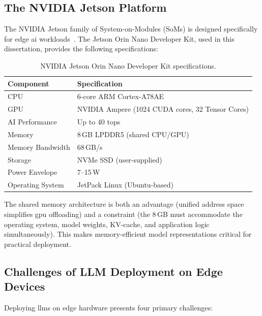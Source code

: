\documentclass[12pt,a4paper,oneside]{report}
\begin{document}
\subsection{The NVIDIA Jetson Platform}

The NVIDIA Jetson family of System-on-Modules (SoMs) is designed specifically for edge \gls{ai} workloads~\cite{nvidia2024jetson}. The Jetson Orin Nano Developer Kit, used in this dissertation, provides the following specifications:

\begin{table}[htbp]
\caption{NVIDIA Jetson Orin Nano Developer Kit specifications.}
\label{tab:jetson-specs}
\centering
\begin{tabular}{ll}
\toprule
\textbf{Component} & \textbf{Specification} \\
\midrule
CPU              & 6-core ARM Cortex-A78AE \\
GPU              & NVIDIA Ampere (1024 CUDA cores, 32 Tensor Cores) \\
AI Performance   & Up to 40 \gls{tops} \\
Memory           & 8\,GB LPDDR5 (shared CPU/GPU) \\
Memory Bandwidth & 68\,GB/s \\
Storage          & NVMe SSD (user-supplied) \\
Power Envelope   & 7--15\,W \\
Operating System & JetPack Linux (Ubuntu-based) \\
\bottomrule
\end{tabular}
\end{table}

The shared memory architecture is both an advantage (unified address space simplifies \gls{gpu} offloading) and a constraint (the 8\,GB must accommodate the operating system, model weights, KV-cache, and application logic simultaneously). This makes memory-efficient model representations critical for practical deployment.

\subsection{Challenges of LLM Deployment on Edge Devices}

Deploying \glspl{llm} on edge hardware presents four primary challenges:
\end{document}
